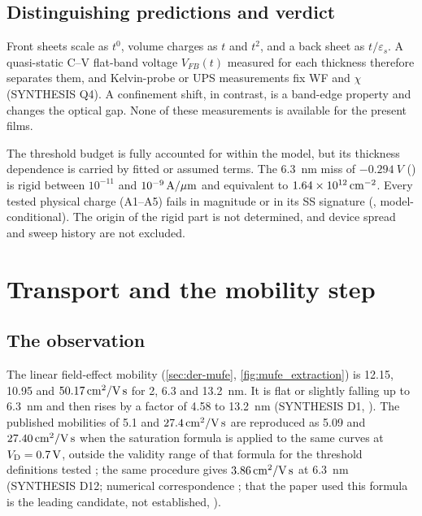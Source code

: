 \subsection{Distinguishing predictions and verdict}
Front sheets scale as $t^0$, volume charges as $t$ and $t^2$, and a back sheet as $t/\varepsilon_s$. A quasi-static C--V flat-band voltage $V_{FB}(t)$ measured for each thickness therefore separates them, and Kelvin-probe or UPS measurements fix WF and $\chi$ (SYNTHESIS Q4). A confinement shift, in contrast, is a band-edge property and changes the optical gap. None of these measurements is available for the present films.

\begin{keyresult}[title={Electrostatics: verdict}]
The threshold budget is fully accounted for within the model, but its thickness dependence is carried by fitted or assumed terms. The \SI{6.3}{nm} miss of $-\SI{0.294}{V}$ () is rigid between $10^{-11}$ and $10^{-9}\,\mathrm{A}/\mu\mathrm{m}$ and equivalent to $1.64\times10^{12}\,\mathrm{cm}^{-2}$. Every tested physical charge (A1--A5) fails in magnitude or in its SS signature (\evNUM, model-conditional). The origin of the rigid part is not determined, and device spread and sweep history are not excluded.
\end{keyresult}

\section{Transport and the mobility step}\label{sec:mech-transport}

\subsection{The observation}
The linear field-effect mobility (\cref{sec:der-mufe}, \cref{fig:mufe_extraction}) is 12.15, 10.95 and $50.17\,\mathrm{cm}^{2}/\mathrm{V\,s}$ for 2, 6.3 and \SI{13.2}{nm}. It is flat or slightly falling up to \SI{6.3}{nm} and then rises by a factor of 4.58 to \SI{13.2}{nm} (SYNTHESIS D1, \evDATA). The published mobilities of 5.1 and $27.4\,\mathrm{cm}^{2}/\mathrm{V\,s}$ are reproduced as 5.09 and $27.40\,\mathrm{cm}^{2}/\mathrm{V\,s}$ when the saturation formula is applied to the same curves at $V_{\mathrm{D}} = \SI{0.7}{V}$, outside the validity range of that formula for the threshold definitions tested ; the same procedure gives $3.86\,\mathrm{cm}^{2}/\mathrm{V\,s}$ at \SI{6.3}{nm} (SYNTHESIS D12; numerical correspondence ; that the paper used this formula is the leading candidate, not established, ).

